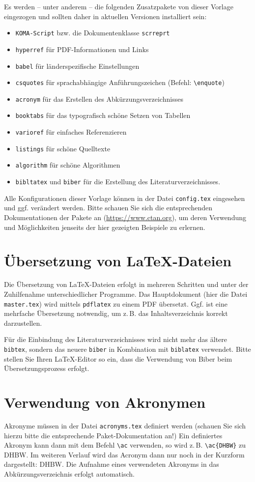 Es werden -- unter anderem -- die folgenden Zusatzpakete von dieser Vorlage eingezogen und sollten daher in aktuellen Versionen installiert sein: 
\begin{itemize}
	\item\texttt{KOMA-Script} bzw. die Dokumentenklasse \texttt{scrreprt}
	\item\texttt{hyperref} für PDF-Informationen und Links 
	\item \texttt{babel} für länderspezifische Einstellungen
	\item \texttt{csquotes} für sprachabhängige Anführungszeichen (Befehl: \texttt{\textbackslash enquote})
	\item \texttt{acronym} für das Erstellen des Abkürzungsverzeichnisses 
	\item \texttt{booktabs} für das typografisch schöne Setzen von Tabellen 
	\item \texttt{varioref} für einfaches Referenzieren 
	\item \texttt{listings} für schöne Quelltexte
	\item \texttt{algorithm} für schöne Algorithmen
	\item \texttt{bibltatex} und \texttt{biber} für die Erstellung des Literaturverzeichnisses.
\end{itemize}
Alle Konfigurationen dieser Vorlage können in der Datei \texttt{config.tex} eingesehen und ggf. verändert werden. Bitte schauen Sie sich die entsprechenden Dokumentationen 
der Pakete an (\url{https://www.ctan.org}), um deren Verwendung und Möglichkeiten jenseits der hier gezeigten Beispiele zu erlernen.


\section{Übersetzung von \LaTeX-Dateien}
Die Übersetzung von \LaTeX-Dateien erfolgt in mehreren Schritten und unter der Zuhilfenahme unterschiedlicher Programme. Das Hauptdokument (hier die Datei \texttt{master.tex}) wird mittels \texttt{pdflatex} zu einem PDF übersetzt. Ggf. ist eine mehrfache Übersetzung notwendig, um z.\,B. das Inhaltsverzeichnis korrekt darzustellen. 

Für die Einbindung des Literaturverzeichnisses wird nicht mehr das ältere \texttt{bibtex}, sondern das neuere \texttt{biber} in Kombination mit \texttt{biblatex} verwendet. Bitte stellen Sie Ihren \LaTeX-Editor so ein, dass die Verwendung von Biber beim Übersetzungsprozess erfolgt. 

\section{Verwendung von Akronymen}
Akronyme müssen in der Datei \texttt{acronyms.tex} definiert werden (schauen Sie sich hierzu bitte die entsprechende Paket-Dokumentation an!)
Ein definiertes Akronym kann dann mit dem Befehl \texttt{\textbackslash ac} verwenden, so wird z.\,B. \texttt{\textbackslash ac\{DHBW\}} zu \ac{DHBW}. Im weiteren Verlauf wird das 
Acronym dann nur noch in der Kurzform dargestellt: \ac{DHBW}. Die Aufnahme eines verwendeten Akronyms in das Abkürzungsverzeichnis erfolgt automatisch. \autocite[Vgl.][S. 77ff]{TestOnlineQuelle}\autocite[Vgl.][S. 42]{ME12}


